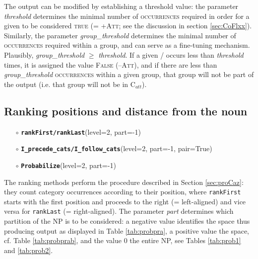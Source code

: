 \documentclass[output=paper,colorlinks,citecolor=brown,draft]{langscibook}
\begin{document}
The output can be modified by establishing a {threshold} value: the parameter \textit{threshold} determines the minimal number of \textsc{occurrences} required in order for a given  to be considered \textsc{true (= +Att;} see the discussion in section \ref{sec:CoFlxx}). Similarly, the parameter \textit{group\_threshold} determines the minimal number of \textsc{occurrences} required within a  group, and can serve as a fine-tuning mechanism. Plausibly, \textit{group\_threshold} $\geq$ \textit{threshold}. If a given / occurs less than \textit{threshold} times, it is assigned the value \textsc{False (--Att)}, and if there are less than  \textit{group\_threshold} \textsc{occurrences} within a given  group, that  group will not be part of the output (i.e. that  group will not be in C$_{att}$). 



\subsection*{Ranking positions and distance from the noun}\largerpage

\begin{enumerate} 

    \item[$\circ$] \textbf{\texttt{rankFirst/rankLast}}(level=2, part=-1) 

    \item[$\circ$] \textbf{\texttt{I\_precede\_cats/I\_follow\_cats}}(level=2,  part=-1, pair=True) 

    \item[$\circ$] \textbf{\texttt{Probabilize}}(level=2, part=-1) 

\end{enumerate}

The ranking methods perform the procedure described in Section \ref{sec:proCaz}: they count category occurrences according to their position, where \texttt{rankFirst} starts with the first position and proceeds to the right (= left-aligned) and vice versa for \texttt{rankLast} (= right-aligned). The parameter \textit{part} determines which partition of the NP is to be considered: a negative value identifies the  space thus producing  output as displayed in Table \ref{tab:probpra}, a positive value the  space, cf. Table \ref{tab:probprab}, and the value 0 the entire NP, see Tables \ref{tab:prob1} and \ref{tab:prob2}. 
\end{document}
